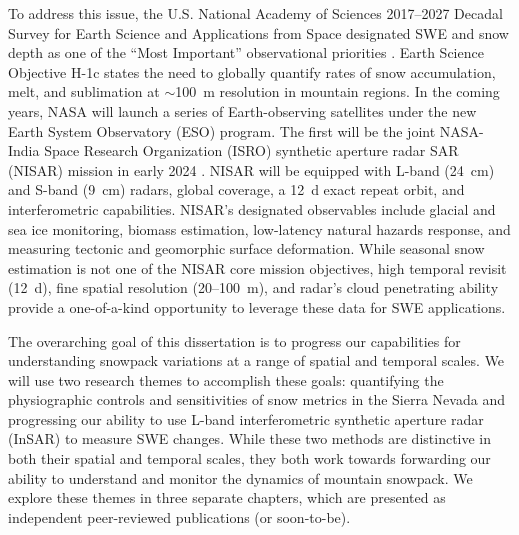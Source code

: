 To address this issue, the U.S. National Academy of Sciences 2017--2027 Decadal Survey for Earth Science and Applications from Space designated SWE and snow depth as one of the ``Most Important” observational priorities \citep{nationalacademiesofsciencesengineeringandmedicineThrivingOurChanging2019}. Earth Science Objective H-1c states the need to globally quantify rates of snow accumulation, melt, and sublimation at $\sim$100~m resolution in mountain regions. In the coming years, NASA will launch a series of Earth-observing satellites under the new Earth System Observatory (ESO) program. The first will be the joint NASA-India Space Research Organization (ISRO) synthetic aperture radar SAR (NISAR) mission in early 2024 \citep{rosenNASAISROSARNISAR2017, kelloggNASAISROSyntheticAperture2020}. NISAR will be equipped with L-band (24~cm) and S-band (9~cm) radars, global coverage, a 12~d exact repeat orbit, and interferometric capabilities. NISAR’s designated observables include glacial and sea ice monitoring, biomass estimation, low-latency natural hazards response, and measuring tectonic and geomorphic surface deformation. While seasonal snow estimation is not one of the NISAR core mission objectives, high temporal revisit (12~d), fine spatial resolution (20--100~m), and radar’s cloud penetrating ability provide a one-of-a-kind opportunity to leverage these data for SWE applications.

The overarching goal of this dissertation is to progress our capabilities for understanding snowpack variations at a range of spatial and temporal scales. We will use two research themes to accomplish these goals: quantifying the physiographic controls and sensitivities of snow metrics in the Sierra Nevada and progressing our ability to use L-band interferometric synthetic aperture radar (InSAR) to measure SWE changes. While these two methods are distinctive in both their spatial and temporal scales, they both work towards forwarding our ability to understand and monitor the dynamics of mountain snowpack. We explore these themes in three separate chapters, which are presented as independent peer-reviewed publications (or soon-to-be). 

